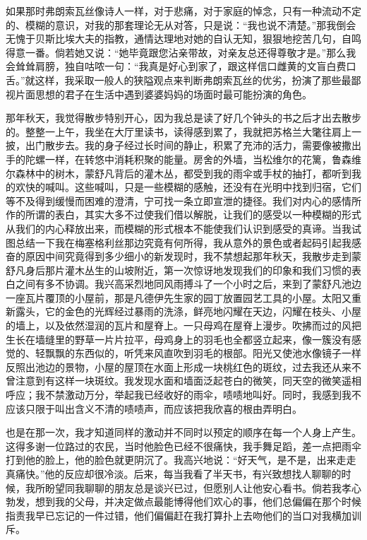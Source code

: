 \par 如果那时弗朗索瓦丝像诗人一样，对于悲痛，对于家庭的悼念，只有一种流动不定的、模糊的意识，对我的那套理论无从对答，只是说：“我也说不清楚。”那我倒会无愧于贝斯比埃大夫的指教，通情达理地对她的自认无知，狠狠地挖苦几句，自鸣得意一番。倘若她又说：“她毕竟跟您沾亲带故，对亲友总还得尊敬才是。”那么我会耸耸肩膀，独自咕哝一句：“我真是好心到家了，跟这样信口雌黄的文盲白费口舌。”就这样，我采取一般人的狭隘观点来判断弗朗索瓦丝的优劣，扮演了那些最鄙视片面思想的君子在生活中遇到婆婆妈妈的场面时最可能扮演的角色。
\par 那年秋天，我觉得散步特别开心，因为我总是读了好几个钟头的书之后才出去散步的。整整一上午，我坐在大厅里读书，读得感到累了，我就把苏格兰大氅往肩上一披，出门散步去。我的身子经过长时间的静止，积累了充沛的活力，需要像被撒出手的陀螺一样，在转悠中消耗积聚的能量。房舍的外墙，当松维尔的花篱，鲁森维尔森林中的树木，蒙舒凡背后的灌木丛，都受到我的雨伞或手杖的抽打，都听到我的欢快的喊叫。这些喊叫，只是一些模糊的感触，还没有在光明中找到归宿，它们等不及得到缓慢而困难的澄清，宁可找一条立即宣泄的捷径。我们对内心的感情所作的所谓的表白，其实大多不过使我们借以解脱，让我们的感受以一种模糊的形式从我们的内心释放出来，而模糊的形式根本不能使我们认识到感受的真谛。当我试图总结一下我在梅塞格利丝那边究竟有何所得，我从意外的景色或者起码引起我感奋的原因中间究竟得到多少细小的新发现时，我不禁想起那年秋天，我散步走到蒙舒凡身后那片灌木丛生的山坡附近，第一次惊讶地发现我们的印象和我们习惯的表白之间有多不协调。我兴高采烈地同风雨搏斗了一个小时之后，来到了蒙舒凡池边一座瓦片覆顶的小屋前，那是凡德伊先生家的园丁放置园艺工具的小屋。太阳又重新露头，它的金色的光辉经过暴雨的洗涤，鲜亮地闪耀在天边，闪耀在枝头、小屋的墙上，以及依然湿润的瓦片和屋脊上。一只母鸡在屋脊上漫步。吹拂而过的风把生长在墙缝里的野草一片片拉平，母鸡身上的羽毛也全都竖立起来，像一簇没有感觉的、轻飘飘的东西似的，听凭来风直吹到羽毛的根部。阳光又使池水像镜子一样反照出池边的景物，小屋的屋顶在水面上形成一块桃红色的斑纹，过去我还从来不曾注意到有这样一块斑纹。我发现水面和墙面泛起苍白的微笑，同天空的微笑遥相呼应；我不禁激动万分，举起我已经收好的雨伞，啧啧地叫好。同时，我感到我不应该只限于叫出含义不清的啧啧声，而应该把我欣喜的根由弄明白。
\par 也是在那一次，我才知道同样的激动并不同时以预定的顺序在每一个人身上产生。这得多谢一位路过的农民，当时他脸色已经不很痛快，我手舞足蹈，差一点把雨伞打到他的脸上，他的脸色就更阴沉了。我高兴地说：“好天气，是不是，出来走走真痛快。”他的反应却很冷淡。后来，每当我看了半天书，有兴致想找人聊聊的时候，我所盼望同我聊聊的朋友总是谈兴已过，但愿别人让他安心看书。倘若我孝心勃发，想到我的父母，并决定做点最能博得他们欢心的事，他们总偏偏在那个时候指责我早已忘记的一件过错，他们偏偏赶在我打算扑上去吻他们的当口对我横加训斥。
